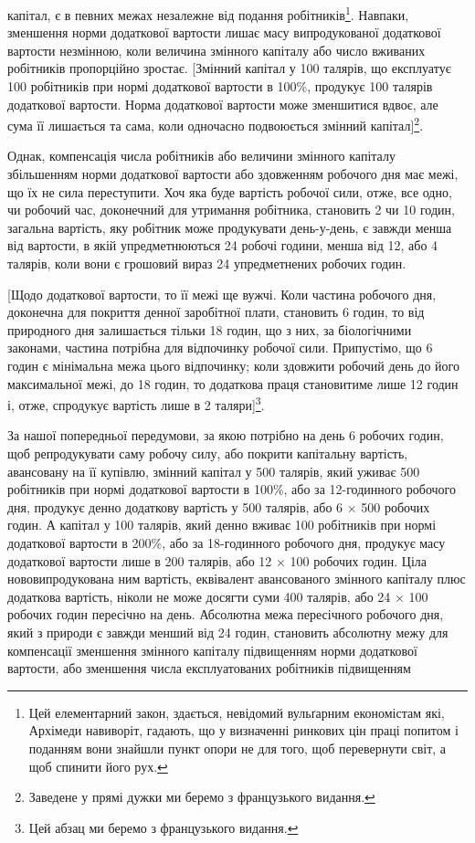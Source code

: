\parcont{}  %
капітал, є в певних межах незалежне від подання робітників\footnote{
Цей елементарний закон, здається, невідомий вульґарним економістам
які, Архімеди навиворіт, гадають, що у визначенні ринкових цін
праці попитом і поданням вони знайшли пункт опори не для того, щоб
перевернути світ, а щоб спинити його рух.
}.
Навпаки, зменшення норми додаткової вартости лишає масу
випродукованої додаткової вартости незмінною, коли величина
змінного капіталу або число вживаних робітників пропорційно
зростає. [Змінний капітал у 100 талярів, що експлуатує 100 робітників
при нормі додаткової вартости в 100\%, продукує 100 талярів
додаткової вартости. Норма додаткової вартости може зменшитися
вдвоє, але сума її лишається та сама, коли одночасно
подвоюється змінний капітал]\footnote*{
Заведене у прямі дужки ми беремо з французького видання. 
}.

Однак, компенсація числа робітників або величини змінного
капіталу збільшенням норми додаткової вартости або здовженням
робочого дня має межі, що їх не сила переступити. Хоч яка
буде вартість робочої сили, отже, все одно, чи робочий час,
доконечний для утримання робітника, становить 2 чи 10 годин,
загальна вартість, яку робітник може продукувати день-у-день,
є завжди менша від вартости, в якій упредметнюються 24 робочі
години, менша від 12, або 4 талярів, коли вони є грошовий
вираз 24 упредметнених робочих годин.

[Щодо додаткової вартости, то її межі ще вужчі. Коли частина
робочого дня, доконечна для покриття денної заробітної плати,
становить 6 годин, то від природного дня залишається тільки 18 годин,
що з них, за біологічними законами, частина потрібна для
відпочинку робочої сили. Припустімо, що 6 годин є мінімальна
межа цього відпочинку; коли здовжити робочий день до його максимальної
межі, до 18 годин, то додаткова праця становитиме
лише 12 годин і, отже, спродукує вартість лише в 2 таляри]\footnote*{
Цей абзац ми беремо з французького видання. 
}.

За нашої попередньої передумови, за якою потрібно на день
6 робочих годин, щоб репродукувати саму робочу силу, або
покрити капітальну вартість, авансовану на її купівлю, змінний
капітал у 500 талярів, який уживає 500 робітників при нормі
додаткової вартости в 100\%, або за 12-годинного робочого дня,
продукує денно додаткову вартість у 500 талярів, або 6 × 500
робочих годин. А капітал у 100 талярів, який денно вживає
100 робітників при нормі додаткової вартости в 200\%, або за 18-годинного
робочого дня, продукує масу додаткової вартости лише
в 200 талярів, або 12 × 100 робочих годин. Ціла нововипродукована
ним вартість, еквівалент авансованого змінного капіталу
плюс додаткова вартість, ніколи не може досягти суми 400 талярів,
або 24 × 100 робочих годин пересічно на день. Абсолютна
межа пересічного робочого дня, який з природи є завжди менший
від 24 годин, становить абсолютну межу для компенсації зменшення
змінного капіталу підвищенням норми додаткової вартости,
або зменшення числа експлуатованих робітників підвищенням
\parbreak{}  %
